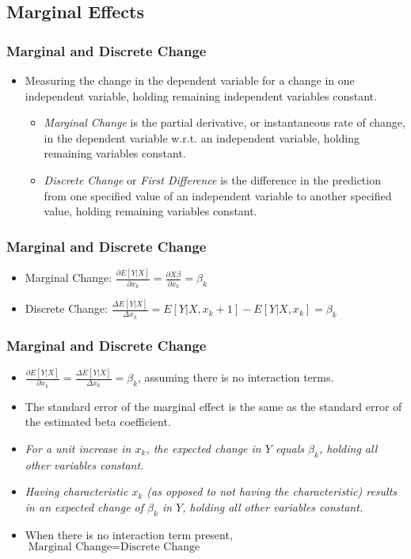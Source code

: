 \documentclass{beamer}
\begin{document}
\subsection{Marginal Effects}

\begin{frame}
	\frametitle{Marginal and Discrete Change}
		\begin{itemize}
			\item Measuring the change in the dependent variable for a change in one independent variable, holding remaining independent variables constant.
				\begin{itemize}
					\item \textit{Marginal Change} is the partial derivative, or instantaneous rate of change, in the dependent variable w.r.t. an independent variable, holding remaining variables constant.
					\item \textit{Discrete Change} or \textit{First Difference} is the difference in the prediction from one specified value of an independent variable to another specified value, holding remaining variables constant.
				\end{itemize}
		\end{itemize}
\end{frame}

\begin{frame}
	\frametitle{Marginal and Discrete Change}
		\begin{itemize}
			\item Marginal Change: $\frac{\partial E[Y|X]}{\partial x_{k}}=\frac{\partial X\beta}{\partial x_{k}}=\beta_{k}$
			\item Discrete Change: $\frac{\Delta E[Y|X]}{\Delta x_{k}}=E[Y|X, x_{k}+1]-E[Y|X, x_{k}]=\beta_{k}$
		\end{itemize}
\end{frame}

\begin{frame}
	\frametitle{Marginal and Discrete Change}
		\begin{itemize}
			\item $\frac{\partial E[Y|X]}{\partial x_{k}}=\frac{\Delta E[Y|X]}{\Delta x_{k}}=\beta_{k}$, assuming there is no interaction terms.
			\item The standard error of the marginal effect is the same as the standard error of the estimated beta coefficient.
			\item \textit{For a unit increase in $x_{k}$, the expected change in $Y$ equals $\beta_{k}$, holding all other variables constant.}
			\item \textit{Having characteristic $x_{k}$ (as opposed to not having the characteristic) results in an expected change of $\beta_{k}$ in $Y$, holding all other variables constant.}
			\item When there is no interaction term present, $\mbox{Marginal Change}=\mbox{Discrete Change}$
		\end{itemize}
\end{frame}
\end{document}
